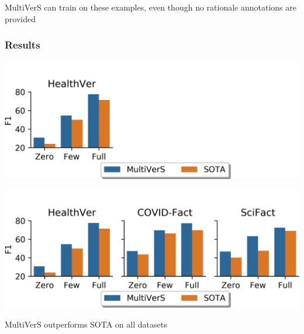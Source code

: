 \documentclass[13.5pt,aspecratio=169, xcolor=dvipsnames]{beamer}
\begin{document}
\begin{frame}
\begin{minipage}[t]{0.54\textwidth}
{            \vspace*{-2em}
             {
                \begin{center}
                    \begin{minipage}{0.9\textwidth}
                        \begin{block}{}
                            MultiVerS can train on these examples, even though no rationale annotations are provided
                        \end{block}
                    \end{minipage}
                \end{center}
            }
            }
        \end{minipage}
       


    
    
\end{frame}


\begin{frame}
    \onehalfspacing
        \frametitle{Results}

         {
            \vspace*{-2pt}
            \hspace{1pt}
            \includegraphics[width=\textwidth]{Result_0.png}

        }
         {
            \includegraphics[width=\textwidth]{Result_1.png}

            \begin{minipage}{0.6\textwidth}
                \begin{block}{}
                    \vspace*{0.5em}MultiVerS outperforms SOTA on all datasets
                \end{block}
            \end{minipage}
        }
       

    
\end{frame}
\end{document}
